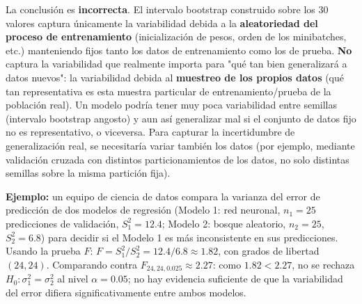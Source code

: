 \begin{solproblema}[prob:cf54ef8]
	La conclusión es \textbf{incorrecta}. El intervalo bootstrap construido sobre los 30 valores captura únicamente la variabilidad debida a la \textbf{aleatoriedad del proceso de entrenamiento} (inicialización de pesos, orden de los minibatches, etc.) manteniendo fijos tanto los datos de entrenamiento como los de prueba. \textbf{No} captura la variabilidad que realmente importa para "qué tan bien generalizará a datos nuevos": la variabilidad debida al \textbf{muestreo de los propios datos} (qué tan representativa es esta muestra particular de entrenamiento/prueba de la población real). Un modelo podría tener muy poca variabilidad entre semillas (intervalo bootstrap angosto) y aun así generalizar mal si el conjunto de datos fijo no es representativo, o viceversa. Para capturar la incertidumbre de generalización real, se necesitaría variar también los datos (por ejemplo, mediante validación cruzada con distintos particionamientos de los datos, no solo distintas semillas sobre la misma partición fija).
\end{solproblema}

\begin{solproblema}[prob:7d50e57]
	\textbf{Ejemplo:} un equipo de ciencia de datos compara la varianza del error de predicción de dos modelos de regresión (Modelo 1: red neuronal, $n_1=25$ predicciones de validación, $S_1^2=12.4$; Modelo 2: bosque aleatorio, $n_2=25$, $S_2^2=6.8$) para decidir si el Modelo 1 es más inconsistente en sus predicciones. Usando la prueba $F$: $F = S_1^2/S_2^2 = 12.4/6.8 \approx 1.82$, con grados de libertad $(24,24)$. Comparando contra $F_{24,24,0.025}\approx2.27$: como $1.82 < 2.27$, no se rechaza $H_0:\sigma_1^2=\sigma_2^2$ al nivel $\alpha=0.05$; no hay evidencia suficiente de que la variabilidad del error difiera significativamente entre ambos modelos.
\end{solproblema}
